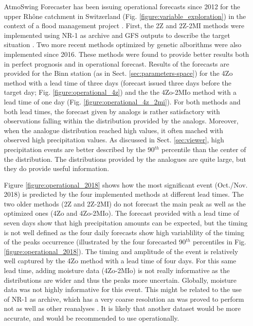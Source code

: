 \documentclass[review]{elsarticle}
\begin{document}
AtmoSwing Forecaster has been issuing operational forecasts since 2012 for the upper Rh\^one catchment in Switzerland (Fig. \ref{figure:variable_exploration}) in the context of a flood management project \citep{GarciaHernandez2009b}. First, the 2Z and 2Z-2MI methods were implemented using NR-1 as archive and GFS outputs to describe the target situation \citep{Horton2012a}. Two more recent methods optimized by genetic alborithms \citep{Horton2018a} were also implemented since 2016. These methods were found to provide better results both in perfect prognosis and in operational forecast. Results of the forecasts are provided for the Binn station (as in Sect. \ref{sec:parameters-space}) for the 4Zo method with a lead time of three days (forecast issued three days before the target day; Fig. \ref{figure:operational_4z}) and the the 4Zo-2MIo method with a lead time of one day (Fig. \ref{figure:operational_4z_2mi}). For both methods and both lead times, the forecast given by analogs is rather satisfactory with observations falling within the distribution provided by the analogs. Moreover, when the analogue distribution reached high values, it often mached with observed high precipitation values. As discussed in Sect. \ref{sec:viewer}, high precipitation events are better described by the 90$^{th}$ percentile than the center of the distribution. The distributions provided by the analogues are quite large, but they do provide useful information.

Figure \ref{figure:operational_2018} shows how the most significant event (Oct./Nov. 2018) is predicted by the four implemented methods at different lead times. The two older methods (2Z and 2Z-2MI) do not forecast the main peak as well as the optimized ones (4Zo and 4Zo-2MIo). The forecast provided with a lead time of seven days show that high precipitation amounts can be expected, but the timing is not well defined as the four daily forecasts show high variablility of the timing of the peaks occurrence (illustrated by the four forecasted 90$^{th}$ percentiles in Fig. \ref{figure:operational_2018}). The timing and amplitude of the event is relatively well captured by the 4Zo method with a lead time of four days. For this same lead time, adding moisture data (4Zo-2MIo) is not really informative as the distributions are wider and thus the peaks more uncertain. Globally, moisture data was not highly informative for this event. This might be related to the use of NR-1 as archive, which has a very coarse resolution an was proved to perform not as well as other reanalyses \citep{Horton2018b}. It is likely that another dataset would be more accurate, and would be recommended to use operationally.
\end{document}
